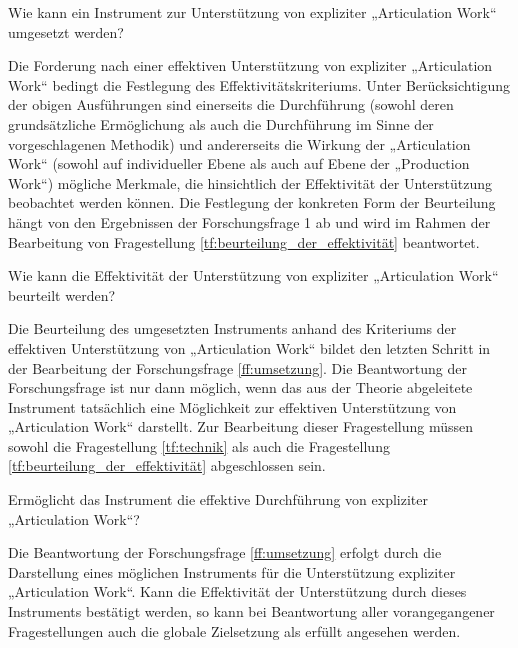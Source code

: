 \begin{tf}
	\label{tf:technik}
	Wie kann ein Instrument zur Unterstützung von expliziter „Articulation Work“ umgesetzt werden?
\end{tf}

Die Forderung nach einer effektiven Unterstützung von expliziter „Articulation Work“ bedingt die Festlegung des Effektivitätskriteriums. Unter Berücksichtigung der obigen Ausführungen sind einerseits die Durchführung (sowohl deren grundsätzliche Ermöglichung als auch die Durchführung im Sinne der vorgeschlagenen Methodik) und andererseits die Wirkung der „Articulation Work“ (sowohl auf individueller Ebene als auch auf Ebene der „Production Work“) mögliche Merkmale, die hinsichtlich der Effektivität der Unterstützung beobachtet werden können. Die Festlegung der konkreten Form der Beurteilung hängt von den Ergebnissen der Forschungsfrage 1 ab und wird im Rahmen der Bearbeitung von Fragestellung \ref{tf:beurteilung_der_effektivität} beantwortet.

\begin{tf}
	\label{tf:beurteilung_der_effektivität}
	Wie kann die Effektivität der Unterstützung von expliziter „Articulation Work“ beurteilt werden?
\end{tf}

Die Beurteilung des umgesetzten Instruments anhand des Kriteriums der effektiven Unterstützung von „Articulation Work“ bildet den letzten Schritt in der Bearbeitung der Forschungsfrage \ref{ff:umsetzung}. Die Beantwortung der Forschungsfrage ist nur dann möglich, wenn das aus der Theorie abgeleitete Instrument tatsächlich eine Möglichkeit zur effektiven Unterstützung von „Articulation Work“ darstellt. Zur Bearbeitung dieser Fragestellung müssen sowohl die Fragestellung \ref{tf:technik} als auch die Fragestellung \ref{tf:beurteilung_der_effektivität} abgeschlossen sein.

\begin{tf}
	\label{tf:empirie}
	Ermöglicht das Instrument die effektive Durchführung von expliziter „Articulation Work“?
\end{tf}

Die Beantwortung der Forschungsfrage \ref{ff:umsetzung} erfolgt durch die Darstellung eines möglichen Instruments für die Unterstützung expliziter „Articulation Work“. Kann die Effektivität der Unterstützung durch dieses Instruments bestätigt werden, so kann bei Beantwortung aller vorangegangener Fragestellungen auch die globale Zielsetzung als erfüllt angesehen werden.

